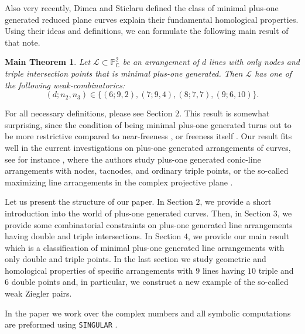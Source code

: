 \documentclass[12pt]{article}
\theoremstyle{plain}
\newtheorem*{theoremA}{Main Theorem}
\theoremstyle{definition}
\begin{document}
Also very recently, Dimca and Sticlaru defined the class of minimal plus-one generated reduced plane curves explain their fundamental homological properties. Using their ideas and definitions, we can formulate the following main result of that note.
\begin{theoremA}
Let $\mathcal{L}\subset \mathbb{P}^{2}_{\mathbb{C}}$ be an arrangement of $d$ lines with only nodes and triple intersection points that is minimal plus-one generated. Then $\mathcal{L}$ has one of the following weak-combinatorics: 
$$(d;n_{2},n_{3}) \in \{(6;9,2),(7;9,4),(8;7,7),(9;6,10)\}.$$
\end{theoremA}
For all necessary definitions, please see Section $2$. This result is somewhat surprising, since the condition of being minimal plus-one generated turns out to be more restrictive compared to near-freeness \cite{Kabat}, or freeness itself \cite{FV}.
Our result fits well in the current investigations on plus-one generated arrangements of curves, see for instance \cite{MP}, where the authors study plus-one generated conic-line arrangements with nodes, tacnodes, and ordinary triple points, or the so-called maximizing line arrangements in the complex projective plane \cite{Liana}.

Let us present the structure of our paper. In Section $2$, we provide a short introduction into the world of plus-one generated curves. Then, in Section $3$, we provide some combinatorial constraints on plus-one generated line arrangements having double and triple intersections. In Section $4$, we provide our main result which is a classification of minimal plus-one generated line arrangements with only double and triple points. In the last section we study geometric and homological properties of specific arrangements with $9$ lines having $10$ triple and $6$ double points and, in particular, we construct a new example of the so-called weak Ziegler pairs.

In the paper we work over the complex numbers and all symbolic computations are preformed using \verb}SINGULAR} \cite{Singular}.
\end{document}

